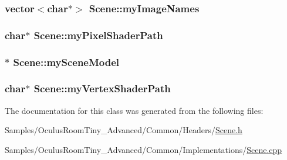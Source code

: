 \subsubsection[{\texorpdfstring{my\+Image\+Names}{myImageNames}}]{\setlength{\rightskip}{0pt plus 5cm}vector$<$char$\ast$$>$ Scene\+::my\+Image\+Names\hspace{0.3cm}{\ttfamily [protected]}}\hypertarget{class_scene_a37cfe0951a860c0fdff5fdc1f01eacc5}{}\label{class_scene_a37cfe0951a860c0fdff5fdc1f01eacc5}
\subsubsection[{\texorpdfstring{my\+Pixel\+Shader\+Path}{myPixelShaderPath}}]{\setlength{\rightskip}{0pt plus 5cm}char$\ast$ Scene\+::my\+Pixel\+Shader\+Path\hspace{0.3cm}{\ttfamily [protected]}}\hypertarget{class_scene_a733ea785e1da8455d1213172fff512a7}{}\label{class_scene_a733ea785e1da8455d1213172fff512a7}
\subsubsection[{\texorpdfstring{my\+Scene\+Model}{mySceneModel}}]{$\ast$ Scene\+::my\+Scene\+Model\hspace{0.3cm}{\ttfamily [protected]}}\hypertarget{class_scene_aee4ac4b42d77693f9ca0afc37171edb2}{}\label{class_scene_aee4ac4b42d77693f9ca0afc37171edb2}
\subsubsection[{\texorpdfstring{my\+Vertex\+Shader\+Path}{myVertexShaderPath}}]{\setlength{\rightskip}{0pt plus 5cm}char$\ast$ Scene\+::my\+Vertex\+Shader\+Path\hspace{0.3cm}{\ttfamily [protected]}}\hypertarget{class_scene_afca007585a1c32c674fa29dc0376f234}{}\label{class_scene_afca007585a1c32c674fa29dc0376f234}


The documentation for this class was generated from the following files\+:\begin{DoxyCompactItemize}
\item 
Samples/\+Oculus\+Room\+Tiny\+\_\+\+Advanced/\+Common/\+Headers/\hyperlink{_scene_8h}{Scene.\+h}\item 
Samples/\+Oculus\+Room\+Tiny\+\_\+\+Advanced/\+Common/\+Implementations/\hyperlink{_scene_8cpp}{Scene.\+cpp}\end{DoxyCompactItemize}
